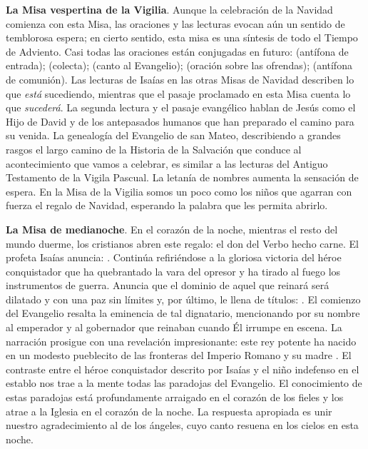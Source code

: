 \textbf{La Misa vespertina de la Vigilia}. Aunque la celebración de la Navidad comienza con esta Misa, las oraciones y las lecturas evocan aún un sentido de temblorosa espera; en cierto sentido, esta misa es una síntesis de todo el Tiempo de Adviento. Casi todas las oraciones están conjugadas en futuro:  (antífona de entrada);  (colecta);  (canto al Evangelio);  (oración sobre las ofrendas);  (antífona de comunión). Las lecturas de Isaías en las otras Misas de Navidad describen lo que \emph{está} sucediendo, mientras que el pasaje proclamado en esta Misa cuenta lo que \emph{sucederá}. La segunda lectura y el pasaje evangélico hablan de Jesús como el Hijo de David y de los antepasados humanos que han preparado el camino para su venida. La genealogía del Evangelio de san Mateo, describiendo a grandes rasgos el largo camino de la Historia de la Salvación que conduce al acontecimiento que vamos a celebrar, es similar a las lecturas del Antiguo Testamento de la Vigila Pascual. La letanía de nombres aumenta la sensación de espera. En la Misa de la Vigilia somos un poco como los niños que agarran con fuerza el regalo de Navidad, esperando la palabra que les permita abrirlo.

\textbf{La Misa de medianoche}. En el corazón de la noche, mientras el resto del mundo duerme, los cristianos abren este regalo: el don del Verbo hecho carne. El profeta Isaías anuncia: . Continúa refiriéndose a la gloriosa victoria del héroe conquistador que ha quebrantado la vara del opresor y ha tirado al fuego los instrumentos de guerra. Anuncia que el dominio de aquel que reinará será dilatado y con una paz sin límites y, por último, le llena de títulos: . El comienzo del Evangelio resalta la eminencia de tal dignatario, mencionando por su nombre al emperador y al gobernador que reinaban cuando Él irrumpe en escena. La narración prosigue con una revelación impresionante: este rey potente ha nacido en un modesto pueblecito de las fronteras del Imperio Romano y su madre . El contraste entre el héroe conquistador descrito por Isaías y el niño indefenso en el establo nos trae a la mente todas las paradojas del Evangelio. El conocimiento de estas paradojas está profundamente arraigado en el corazón de los fieles y los atrae a la Iglesia en el corazón de la noche. La respuesta apropiada es unir nuestro agradecimiento al de los ángeles, cuyo canto resuena en los cielos en esta noche.

